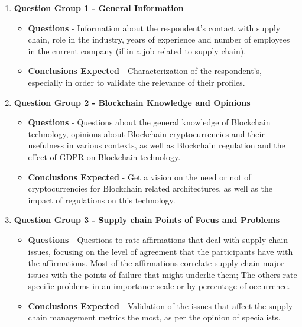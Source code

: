 \begin{enumerate}

\item \textbf{Question Group 1 - General Information}
	\begin{itemize}
	\item \textbf{Questions} - Information about the respondent's contact with supply chain, role in the industry, years of experience and number of employees in the current company (if in a job related to supply chain).
    \item \textbf{Conclusions Expected} - Characterization of the respondent's, especially in order to validate the relevance of their profiles.
	\end{itemize}
    
\item \textbf{Question Group 2 - Blockchain Knowledge and Opinions}
	\begin{itemize}
	\item \textbf{Questions} - Questions about the general knowledge of Blockchain technology, opinions about Blockchain cryptocurrencies and their usefulness in various contexts, as well as Blockchain regulation and the effect of GDPR on Blockchain technology.
    \item \textbf{Conclusions Expected} - Get a vision on the need or not of cryptocurrencies for Blockchain related architectures, as well as the impact of regulations on this technology.
	\end{itemize}
    
\item \textbf{Question Group 3 - Supply chain Points of Focus and Problems}
	\begin{itemize}
    \item \textbf{Questions} - Questions to rate affirmations that deal with supply chain issues, focusing on the level of agreement that the participants have with the affirmations. Most of the affirmations correlate supply chain major issues with the points of failure that might underlie them; The others rate specific problems in an importance scale or by percentage of occurrence.
    \item \textbf{Conclusions Expected} - Validation of the issues that affect the supply chain management metrics the most, as per the opinion of specialists.
	\end{itemize}
    

\end{enumerate}
